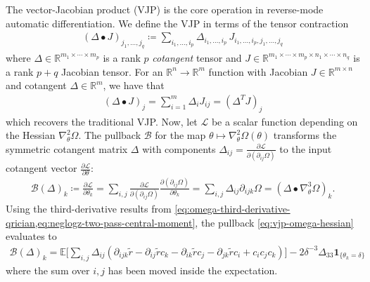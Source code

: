 \documentclass{article}
\begin{document}
The vector-Jacobian product (VJP) is the core operation in reverse-mode automatic differentiation.
We define the VJP in terms of the tensor contraction
%
\begin{align}\label{eq:general-bullet-contraction}
  (\Delta \bullet J)_{j_1, \ldots, j_q} \coloneqq \sum_{i_1, \ldots, i_p} \Delta_{i_1, \ldots, i_p} \, J_{i_1, \ldots, i_p, j_1, \ldots, j_q}
\end{align}
%
where $\Delta \in \mathbb{R}^{m_1 \times \cdots \times m_p}$ is a rank $p$ \textit{cotangent} tensor and $J \in \mathbb{R}^{m_1 \times \cdots \times m_p \times n_1 \times \cdots \times n_q}$ is a rank $p+q$ Jacobian tensor.
For an $\mathbb{R}^n \to \mathbb{R}^m$ function with Jacobian $J \in \mathbb{R}^{m \times n}$ and cotangent $\Delta \in \mathbb{R}^m$, we have that
%
\begin{align}
  (\Delta \bullet J)_j = \sum_{i=1}^m \Delta_i J_{i j} = (\Delta^{T} J)_j
\end{align}
%
which recovers the traditional VJP.
Now, let $\mathcal{L}$ be a scalar function depending on the Hessian $\nabla_\theta^2 \Omega$.
The pullback $\mathcal{B}$ for the map $\theta \mapsto \nabla_\theta^2 \Omega(\theta)$ transforms the symmetric cotangent matrix $\Delta$ with components $\Delta_{ij} = \frac{\partial \mathcal{L}}{\partial (\partial_{ij} \Omega)}$ to the input cotangent vector $\frac{\partial \mathcal{L}}{\partial \theta}$:
%
\begin{align}
  \mathcal{B}(\Delta)_k \coloneqq \frac{\partial \mathcal{L}}{\partial \theta_k} = \sum_{i,j} \frac{\partial \mathcal{L}}{\partial (\partial_{ij} \Omega)} \frac{\partial (\partial_{ij} \Omega)}{\partial \theta_k} = \sum_{i,j} \Delta_{ij} \partial_{ijk} \Omega = (\Delta \bullet \nabla_\theta^3 \Omega)_k. \label{eq:vjp-omega-hessian}
\end{align}
%
Using the third-derivative results from \cref{eq:omega-third-derivative-qrician,eq:neglogz-two-pass-central-moment}, the pullback \cref{eq:vjp-omega-hessian} evaluates to
%
\begin{align}
  \mathcal{B}(\Delta)_k = \mathbb{E} \bigg[ \sum_{i,j} \Delta_{ij} (\partial_{ijk} \tilde{r} - \partial_{ij} \tilde{r} c_k - \partial_{ik} \tilde{r} c_j - \partial_{jk} \tilde{r} c_i + c_i c_j c_k) \bigg] - 2 \delta^{-3} \Delta_{33} \mathbf{1}_{\{\theta_k=\delta\}}
\end{align}
%
where the sum over $i,j$ has been moved inside the expectation.
\end{document}
